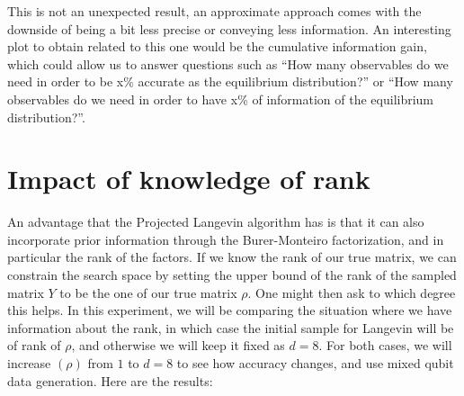 \documentclass[12pt]{memoir}
\newcommand{\rhorank}[0]{\text{rank}$(\rho) $ }
\begin{document}
This is not an unexpected result, an approximate approach comes with the downside of being a bit less precise or conveying less information. An interesting plot to obtain related to this one would be the cumulative information gain, which could allow us to answer questions such as ``How many observables do we need in order to be x\% accurate as the equilibrium distribution?'' or ``How many observables do we need in order to have x\% of information of the equilibrium distribution?''.

\section{Impact of knowledge of rank}\label{section:comp-rank-info}
An advantage that the Projected Langevin algorithm has is that it can also incorporate prior information through the Burer-Monteiro factorization, and in particular the rank of the factors. If we know the rank of our true matrix, we can constrain the search space by setting the upper bound of the rank of the sampled matrix $Y$ to be the one of our true matrix $\rho$. One might then ask to which degree this helps. In this experiment, we will be comparing the situation where we have information about the rank, in which case the initial sample for Langevin will be of rank of $\rho$, and otherwise we will keep it fixed as $d=8$. For both cases, we will increase \rhorank from $1$ to $d=8$ to see how accuracy changes, and use mixed qubit data generation. Here are the results:
\end{document}
